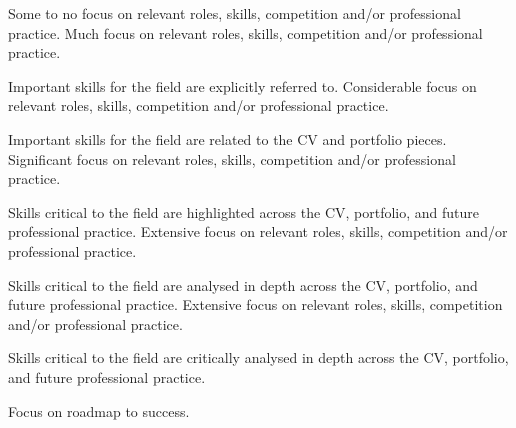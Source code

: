\documentclass{../../fal_assignment}
\begin{document}
\begin{markingrubric}
%
%
        \grade  \fail	Some to no focus on relevant roles, skills, competition and/or professional practice.
        \grade 		Much focus on relevant roles, skills, competition and/or professional practice.
            \par 		Important skills for the field are explicitly referred to.
        \grade 		Considerable focus on relevant roles, skills, competition and/or professional practice.
            \par 		Important skills for the field are related to the CV and portfolio  pieces.
        \grade 		Significant focus on relevant roles, skills, competition and/or professional practice.
            \par 		Skills critical to the field are highlighted across the CV, portfolio, and future professional practice.
        \grade 		Extensive focus on relevant roles, skills, competition and/or professional practice.
            \par 		Skills critical to the field are analysed in depth across the CV, portfolio, and future professional practice.
        \grade 		Extensive focus on relevant roles, skills, competition and/or professional practice.
            \par 		Skills critical to the field are critically analysed in depth across the CV, portfolio, and future professional practice.
            \par 		Focus on roadmap to success.
%

\end{markingrubric}
\end{document}
